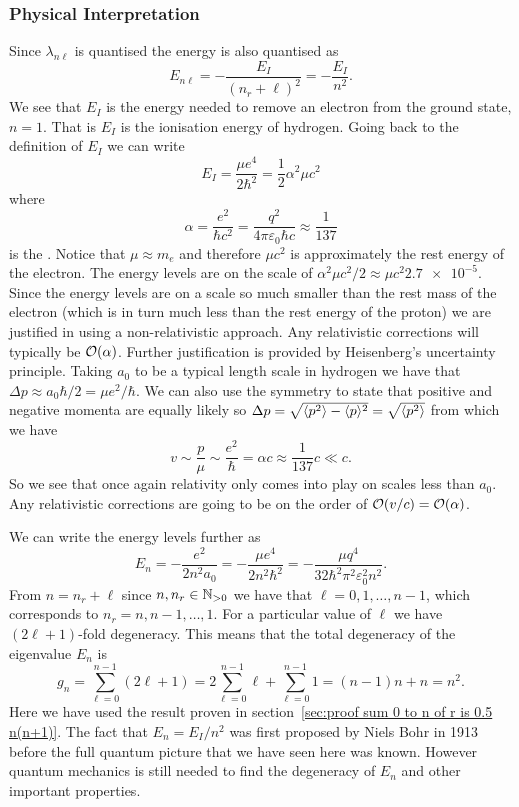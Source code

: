 \subsubsection{Physical Interpretation}
Since \(\lambda_{n\ell}\) is quantised the energy is also quantised as
\[E_{n\ell} = -\frac{E_I}{(n_r + \ell)^2} = -\frac{E_I}{n^2}.\]
We see that \(E_I\) is the energy needed to remove an electron from the ground state, \(n = 1\).
That is \(E_I\) is the ionisation energy of hydrogen.
Going back to the definition of \(E_I\) we can write
\[E_I = \frac{\mu e^4}{2\hbar^2} = \frac{1}{2}\alpha^2\mu c^2\]
where
\[\alpha = \frac{e^2}{\hbar c^2} = \frac{q^2}{4\pi\varepsilon_0\hbar c} \approx \frac{1}{137}\]
is the .
Notice that \(\mu \approx m_e\) and therefore \(\mu c^2\) is approximately the rest energy of the electron.
The energy levels are on the scale of \(\alpha^2\mu c^2/2 \approx \mu c^2 \num{2.7e-5}\).
Since the energy levels are on a scale so much smaller than the rest mass of the electron (which is in turn much less than the rest energy of the proton) we are justified in using a non-relativistic approach.
Any relativistic corrections will typically be \(\mathcal{O}{(\alpha)}\).
Further justification is provided by Heisenberg's uncertainty principle.
Taking \(a_0\) to be a typical length scale in hydrogen we have that \(\Delta p \approx a_0\hbar/2 = \mu e^2/\hbar\).
We can also use the symmetry to state that positive and negative momenta are equally likely so \(\Delta p = \sqrt{\langle{p^2}\rangle - \langle{p}\rangle^2} = \sqrt{\langle{p^2}\rangle}\) from which we have
\[v \sim \frac{p}{\mu} \sim \frac{e^2}{\hbar} = \alpha c \approx \frac{1}{137}c \ll c.\]
So we see that once again relativity only comes into play on scales less than \(a_0\).
Any relativistic corrections are going to be on the order of \(\mathcal{O}{(v/c)} = \mathcal{O}{(\alpha)}\).

We can write the energy levels further as
\[E_n = -\frac{e^2}{2n^2a_0} = -\frac{\mu e^4}{2n^2\hbar^2} = -\frac{\mu q^4}{32\hbar^2\pi^2\varepsilon_0^2n^2}.\]
From \(n = n_r + \ell\) since \(n, n_r\in\mathbb{N}_{>0}\) we have that \(\ell = 0, 1, \dotsc, n - 1\), which corresponds to \(n_r = n, n-1, \dotsc, 1\).
For a particular value of \(\ell\) we have \((2\ell + 1)\)-fold degeneracy.
This means that the total degeneracy of the eigenvalue \(E_n\) is
\[g_n = \sum_{\ell = 0}^{n - 1}(2\ell + 1) = 2\sum_{\ell=0}^{n-1}\ell + \sum_{\ell=0}^{n-1}1 = (n - 1)n + n = n^2.\]
Here we have used the result proven in section~\ref{sec:proof sum 0 to n of r is 0.5 n(n+1)}.
The fact that \(E_n = E_I/n^2\) was first proposed by Niels Bohr in 1913 before the full quantum picture that we have seen here was known.
However quantum mechanics is still needed to find the degeneracy of \(E_n\) and other important properties.

